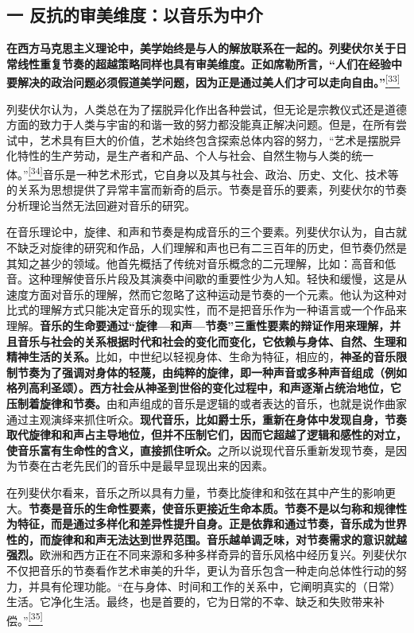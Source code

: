 \documentclass[UTF8, fontset = sourcesans, a4paper, oneside, zihao =
-4, scheme=chinese, no-math, space=true]{ctexbook}
\begin{document}
\subsection{一
反抗的审美维度：以音乐为中介}\label{part0009_split_004.htmlux5cux23c053}

\textbf{在西方马克思主义理论中，美学始终是与人的解放联系在一起的。列斐伏尔关于日常线性重复节奏的超越策略同样也具有审美维度。正如席勒所言，``人们在经验中要解决的政治问题必须假道美学问题，因为正是通过美人们才可以走向自由。''}\protect\hypertarget{part0009_split_004.htmlux5cux23w33}{}{}\protect\hyperlink{part0009_split_004.htmlux5cux23m33}{\textsuperscript{{[}33{]}}}

列斐伏尔认为，人类总在为了摆脱异化作出各种尝试，但无论是宗教仪式还是道德方面的致力于人类与宇宙的和谐一致的努力都没能真正解决问题。但是，在所有尝试中，艺术具有巨大的价值，艺术始终包含探索总体内容的努力，``艺术是摆脱异化特性的生产劳动，是生产者和产品、个人与社会、自然生物与人类的统一体。''\protect\hypertarget{part0009_split_004.htmlux5cux23w34}{}{}\protect\hyperlink{part0009_split_004.htmlux5cux23m34}{\textsuperscript{{[}34{]}}}音乐是一种艺术形式，它自身以及其与社会、政治、历史、文化、技术等的关系为思想提供了异常丰富而新奇的启示。节奏是音乐的要素，列斐伏尔的节奏分析理论当然无法回避对音乐的研究。

在音乐理论中，旋律、和声和节奏是构成音乐的三个要素。列斐伏尔认为，自古就不缺乏对旋律的研究和作品，人们理解和声也已有二三百年的历史，但节奏仍然是其知之甚少的领域。他首先概括了传统对音乐概念的二元理解，比如：高音和低音。这种理解使音乐片段及其演奏中间歇的重要性少为人知。轻快和缓慢，这是从速度方面对音乐的理解，然而它忽略了这种运动是节奏的一个元素。他认为这种对比式的理解方式只能决定音乐的现实性，而不是把音乐作为一种语言或一个作品来理解。\textbf{音乐的生命要通过``旋律---和声---节奏''三重性要素的辩证作用来理解，并且音乐与社会的关系根据时代和社会的变化而变化，它依赖与身体、自然、生理和精神生活的关系。}比如，中世纪以轻视身体、生命为特征，相应的，\textbf{神圣的音乐限制节奏为了强调对身体的轻蔑，由纯粹的旋律，即一种声音或多种声音组成（例如格列高利圣颂）。西方社会从神圣到世俗的变化过程中，和声逐渐占统治地位，它压制着旋律和节奏。}由和声组成的音乐是逻辑的或者表达的音乐，也就是说作曲家通过主观演绎来抓住听众。\textbf{现代音乐，比如爵士乐，重新在身体中发现自身，节奏取代旋律和和声占主导地位，但并不压制它们，因而它超越了逻辑和感性的对立，使音乐富有生命性的含义，直接抓住听众。}之所以说现代音乐重新发现节奏，是因为节奏在古老先民们的音乐中是最早显现出来的因素。

在列斐伏尔看来，音乐之所以具有力量，节奏比旋律和和弦在其中产生的影响更大。\textbf{节奏是音乐的生命性要素，使音乐更接近生命本质。节奏不是以匀称和规律性为特征，而是通过多样化和差异性提升自身。正是依靠和通过节奏，音乐成为世界性的，而旋律和和声无法达到世界范围。音乐越单调乏味，对节奏需求的意识就越强烈。}欧洲和西方正在不同来源和多种多样奇异的音乐风格中经历复兴。列斐伏尔不仅把音乐的节奏看作艺术审美的升华，更认为音乐包含一种走向总体性行动的努力，并具有伦理功能。``在与身体、时间和工作的关系中，它阐明真实的（日常）生活。它净化生活。最终，也是首要的，它为日常的不幸、缺乏和失败带来补偿。''\protect\hypertarget{part0009_split_004.htmlux5cux23w35}{}{}\protect\hyperlink{part0009_split_004.htmlux5cux23m35}{\textsuperscript{{[}35{]}}}
\end{document}
